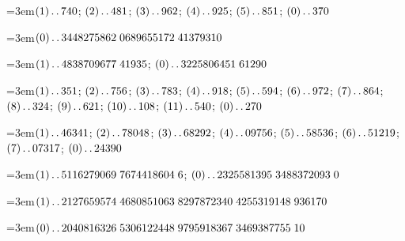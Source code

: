\par\noindent\hangindent=3em\enspace $(1)\mathinner{.\,.}740$; $(2)\mathinner{.\,.}481$; $(3)\mathinner{.\,.}962$; $(4)\mathinner{.\,.}925$; $(5)\mathinner{.\,.}851$; $(0)\mathinner{.\,.}370$\par\smallskip

\par\noindent\hangindent=3em\enspace $(0)\mathinner{.\,.}3448275862\;\allowbreak 0689655172\;\allowbreak 41379310$\par\smallskip

\par\noindent\hangindent=3em\enspace $(1)\mathinner{.\,.}4838709677\;\allowbreak 41935$; $(0)\mathinner{.\,.}3225806451\;\allowbreak 61290$\par\smallskip

\par\noindent\hangindent=3em\enspace $(1)\mathinner{.\,.}351$; $(2)\mathinner{.\,.}756$; $(3)\mathinner{.\,.}783$; $(4)\mathinner{.\,.}918$; $(5)\mathinner{.\,.}594$; $(6)\mathinner{.\,.}972$; $(7)\mathinner{.\,.}864$; $(8)\mathinner{.\,.}324$; $(9)\mathinner{.\,.}621$; $(10)\mathinner{.\,.}108$; $(11)\mathinner{.\,.}540$; $(0)\mathinner{.\,.}270$\par\smallskip

\par\noindent\hangindent=3em\enspace $(1)\mathinner{.\,.}46341$; $(2)\mathinner{.\,.}78048$; $(3)\mathinner{.\,.}68292$; $(4)\mathinner{.\,.}09756$; $(5)\mathinner{.\,.}58536$; $(6)\mathinner{.\,.}51219$; $(7)\mathinner{.\,.}07317$; $(0)\mathinner{.\,.}24390$\par\smallskip

\par\noindent\hangindent=3em\enspace $(1)\mathinner{.\,.}5116279069\;\allowbreak 7674418604\;\allowbreak 6$; $(0)\mathinner{.\,.}2325581395\;\allowbreak 3488372093\;\allowbreak 0$\par\smallskip

\par\noindent\hangindent=3em\enspace $(1)\mathinner{.\,.}2127659574\;\allowbreak 4680851063\;\allowbreak 8297872340\;\allowbreak 4255319148\;\allowbreak 936170$\par\smallskip

\par\noindent\hangindent=3em\enspace $(0)\mathinner{.\,.}2040816326\;\allowbreak 5306122448\;\allowbreak 9795918367\;\allowbreak 3469387755\;\allowbreak 10$\par\smallskip

